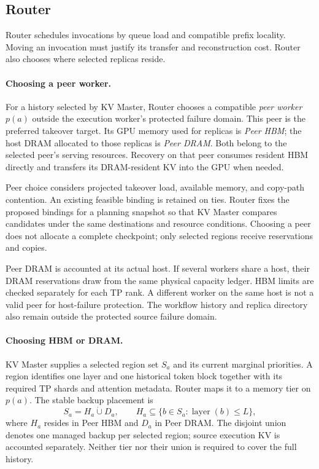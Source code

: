 \subsection{Router}
\label{sec:router}

Router schedules invocations by queue load and compatible prefix
locality. Moving an invocation must justify its transfer and
reconstruction cost. Router also chooses where selected replicas reside.

\paragraph{Choosing a peer worker.}
For a history selected by KV Master, Router chooses a compatible
\emph{peer worker} $p(a)$ outside the execution worker's protected
failure domain. This peer is the preferred takeover target. Its GPU
memory used for replicas is \emph{Peer HBM}; the host DRAM allocated to
those replicas is \emph{Peer DRAM}. Both belong to the selected peer's
serving resources. Recovery on that peer consumes resident HBM directly
and transfers its DRAM-resident KV into the GPU when needed.

Peer choice considers projected takeover load, available memory, and
copy-path contention. An existing feasible binding is retained on ties.
Router fixes the proposed bindings for a planning snapshot so that KV
Master compares candidates under the same destinations and resource
conditions. Choosing a peer does not allocate a complete checkpoint;
only selected regions receive reservations and copies.

Peer DRAM is accounted at its actual host. If several workers share a
host, their DRAM reservations draw from the same physical capacity
ledger. HBM limits are checked separately for each TP rank. A different
worker on the same host is not a valid peer for host-failure protection.
The workflow history and replica directory also remain outside the
protected source failure domain.

\paragraph{Choosing HBM or DRAM.}
KV Master supplies a selected region set $S_a$ and its current marginal
priorities. A region identifies one layer and one historical token block
together with its required TP shards and attention metadata. Router
maps it to a memory tier on $p(a)$. The stable backup placement is
\begin{equation}
 S_a=H_a\mathbin{\dot\cup}D_a,\qquad
 H_a\subseteq\{b\in S_a:\operatorname{layer}(b)\le L\},
 \label{eq:placement}
\end{equation}
where $H_a$ resides in Peer HBM and $D_a$ in Peer DRAM. The disjoint
union denotes one managed backup per selected region; source execution
KV is accounted separately. Neither tier nor their union is required
to cover the full history.

